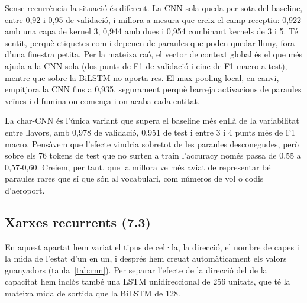 Sense recurrència la situació és diferent. La CNN sola queda per sota del baseline, entre 0,92 i 0,95 de
validació, i millora a mesura que creix el camp receptiu: 0,922 amb una capa de kernel 3, 0,944 amb dues i 0,954
combinant kernels de 3 i 5. Té sentit, perquè etiquetes com  i  depenen de
paraules que poden quedar lluny, fora d'una finestra petita. Per la mateixa raó, el vector de context global és
el que més ajuda a la CNN sola (dos punts de F1 de validació i cinc de F1 macro a test), mentre que sobre la BiLSTM
no aporta res. El max-pooling local, en canvi, empitjora la CNN fins a 0,935, segurament perquè barreja
activacions de paraules veïnes i difumina on comença i on acaba cada entitat.

La char-CNN és l'única variant que supera el baseline més enllà de la variabilitat entre llavors, amb 0,978 de
validació, 0,951 de test i entre 3 i 4 punts més de F1 macro. Pensàvem que l'efecte vindria sobretot de les
paraules desconegudes, però sobre els 76 tokens de test que no surten a train l'accuracy només passa de 0,55 a
0,57-0,60. Creiem, per tant, que la millora ve més aviat de representar bé paraules rares que sí que són al
vocabulari, com números de vol o codis d'aeroport.

\subsection{Xarxes recurrents (7.3)}
\label{sec:rnn}

En aquest apartat hem variat el tipus de cel·la, la direcció, el nombre de capes i la mida de l'estat d'un en un,
i després hem creuat automàticament els valors guanyadors (taula~\ref{tab:rnn}). Per separar l'efecte de la
direcció del de la capacitat hem inclòs també una LSTM unidireccional de 256 unitats, que té la mateixa mida de
sortida que la BiLSTM de 128.

